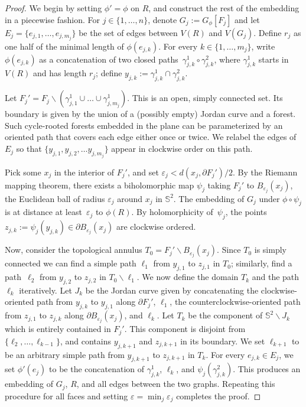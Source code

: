 \documentclass[11pt,letterpaper]{amsart}
\newcounter{n}
\numberwithin{n}{section}
\theoremstyle{plain}
\theoremstyle{definition}
\theoremstyle{remark}
\newcommand\eps\varepsilon
\renewcommand\setminus\smallsetminus
\newcommand{\1}{\mathbbm{1}}
\begin{document}
\begin{proof}
We begin by setting $\phi' = \phi$ on $R$, and construct the rest of the embedding in a piecewise fashion. For $j \in \{1,\dots, n\}$, denote $G_j := G_{\phi}[F_j]$ and let $E_j= \{e_{j,1}, \dots, e_{j,m_j}\}$ be the set of edges between $V(R)$ and $V(G_j)$. 
Define $r_j$ as one half of the minimal length of $\phi(e_{j,k})$.
For every $k \in \{1, \dots, m_j\}$, write~$\phi(e_{j,k})$ as a concatenation of two closed paths~$\gamma_{j,k}^{1}\circ\gamma_{j,k}^{2}$, where $\gamma_{j,k}^1$ starts in~$V(R)$ and has length $r_j$; define $y_{j,k}:=\gamma_{j,k}^{1}\cap\gamma_{j,k}^{2}$.

Let $F_j' = F_j \setminus (\gamma_{j,1}^1\cup\dots\cup\gamma_{j,m_j}^1)$. 
This is an open, simply connected set. Its boundary is given by the union of a (possibly empty) Jordan curve and a forest. Such cycle-rooted forests embedded in the plane can be parameterized by an oriented path that covers each edge either once or twice.
We relabel the edges of $E_j$ so that $\{y_{j,1}, y_{j,2}, \dots  y_{j,m_j}\}$ appear in clockwise order on this path.

Pick some $x_j$ in the interior of $F_j'$, and set $\eps_j < d(x_j, \partial F_j')/2$. By the Riemann mapping theorem, there exists a biholomorphic map $\psi_j$ taking $F_j'$ to $B_{\eps_j}(x_j)$, the Euclidean ball of radius $\eps_j$ around $x_j$ in $\mathbb{S}^2$. 
The embedding of $G_j$ under $\phi\circ\psi_j$ is at distance at least~$\eps_j$ to $\phi(R)$.
By holomorphicity of~$\psi_j$, the points~$z_{j,k}:=\psi_j(y_{j,k})\in\partial B_{\eps_j}(x_j)$ are clockwise ordered.

Now, consider the topological annulus $T_0 = F_j' \setminus B_{\eps_j}(x_j)$. Since $T_0$ is simply connected we can find a simple path $\ell_1$ from $y_{j,1}$ to $z_{j,1}$ in $T_0$; similarly, find a path~$\ell_2$ from $y_{j,2}$ to $z_{j,2}$ in $T_0 \setminus \ell_1$. We now define the domain $T_k$ and the path $\ell_k$ iteratively. Let $J_k$ be the Jordan curve given by concatenating the clockwise-oriented path from $y_{j,k}$ to $y_{j,1}$ along $\partial F_j'$, $\ell_1$, the counterclockwise-oriented path from $z_{j,1}$ to $z_{j,k}$ along $\partial B_{\eps_j}(x_j)$, and $\ell_k$. Let $T_k$ be the component of $\mathbb{S}^2\setminus J_k$ which is entirely contained in $F_j'$. This component is disjoint from $\{\ell_2, \dots, \ell_{k-1}\}$, and contains $y_{j,k+1}$ and $z_{j,k+1}$ in its boundary. We set $\ell_{k+1}$ to be an arbitrary simple path from $y_{j,k+1}$ to $z_{j,k+1}$ in $T_k$. For every $e_{j,k} \in E_j$, we set $\phi'(e_j)$ to be the concatenation of $\gamma_{j,k}^1$, $\ell_k$, and $\psi_j(\gamma_{j,k}^2)$. This produces an embedding of $G_j$, $R$, and all edges between the two graphs. Repeating this procedure for all faces and setting $\varepsilon = \min_j \varepsilon_j$ completes the proof. 
\end{proof}
\end{document}

